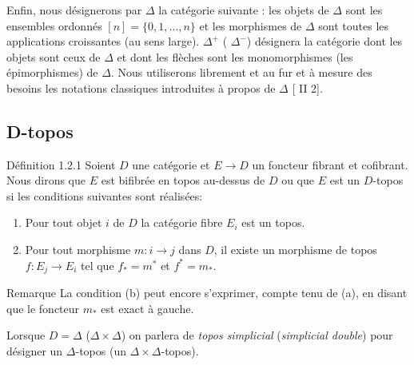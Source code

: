 \documentclass[10pt]{../fichiers-configuration-latex/smfart}
\begin{document}
\subsubsection{}

Enfin, nous désignerons par $\Delta$ la catégorie suivante : les
objets de $\Delta$ sont les ensembles ordonnés $[n] = \{ 0, 1,
\ldots, n \}$ et les morphismes de $\Delta$ sont toutes les
applications croissantes (au sens large). $\Delta^{+}$ (\resp
$\Delta^{-}$) désignera la catégorie dont les objets sont ceux de
$\Delta$ et dont les flèches sont les monomorphismes (\resp les
épimorphismes) de $\Delta$. Nous utiliserons librement et au fur et
à mesure des besoins les notations classiques introduites à propos de
$\Delta$ [\cf \cite{SGA4-05bis:3} II 2].

\subsection{D-topos}

\begin{enonce*}{Définition 1.2.1}
Soient $D$ une catégorie et $E \to D$ un foncteur fibrant et cofibrant. Nous
dirons que $E$ est bifibrée en topos au-dessus de $D$ ou que $E$ est un
$D$-topos si les conditions suivantes sont réalisées:
\begin{enumerate}
\renewcommand{\theenumi}{\alph{enumi}}
\renewcommand{\labelenumi}{(\theenumi)}
\item Pour tout objet $i$ de $D$ la catégorie fibre $E_i$ est un
  topos.

\item Pour tout morphisme $m : i \to j$ dans $D$, il existe un morphisme
    de topos $f : E_j \to E_i$ tel que $f_{\ast} = m^{\ast}$ et $f^{\ast}
    = m_{\ast}$.
\end{enumerate}
\end{enonce*}

\begin{enonce*}[remark]{Remarque}
La condition (b) peut encore s'exprimer, compte tenu de (a), en disant
que le foncteur $m_{\ast}$ est exact à gauche.
\end{enonce*}

Lorsque $D = \Delta$ (\resp $\Delta \times \Delta$) on parlera
de \emph{topos simplicial} (\resp \emph{simplicial double}) pour désigner un
$\Delta$-topos (\resp un $\Delta \times \Delta$-topos).
\end{document}
